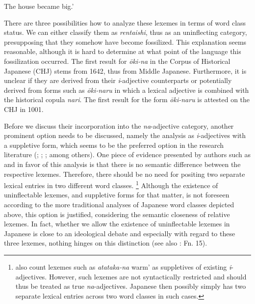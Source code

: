 \documentclass[output=paper]{langscibook}
\begin{document}
\begin{styleBeispielCinqueKapitel}
{\textasciigrave}The house became big.’
\end{styleBeispielCinqueKapitel}

There are three possibilities how to analyze these lexemes in terms of word class status. We can either classify them as \textit{rentaishi}, thus as an uninflecting category, presupposing that they somehow have become fossilized. This explanation seems reasonable, although it is hard to determine at what point of the language this fossilization occurred. The first result for \textit{ōki-na} in the Corpus of Historical Japanese (CHJ) stems from 1642, thus from Middle Japanese. Furthermore, it is unclear if they are derived from their \textit{i}{}-adjective counterparts or potentially derived from forms such as \textit{ōki-naru} in which a lexical adjective is combined with the historical copula \textit{nari}. The first result for the form \textit{ōki-naru} is attested on the CHJ in 1001.

Before we discuss their incorporation into the \textit{na}{}-adjective category, another prominent option needs to be discussed, namely the analysis as \textit{i}{}-adjectives with a suppletive form, which seems to be the preferred option in the research literature (\citealt{Suzuki1972}; \citealt{Rickmeyer1995}; \citealt{Muraki2012}; \citealt{LehmannNishina2015} among others). One piece of evidence presented by authors such as \citet{Suzuki1972} and \citet{LehmannNishina2015} in favor of this analysis is that there is no semantic difference between the respective lexemes. Therefore, there should be no need for positing two separate lexical entries in two different word classes.\textstyleFootnoteSymbol{} \footnote{\citet{LehmannNishina2015} also count lexemes such as \textit{atataka-na} {\textasciigrave}warm’ as suppletives of existing \textit{i}{}-adjectives. However, such lexemes are not syntactically restricted and should thus be treated as true \textit{na}{}-adjectives. Japanese then possibly simply has two separate lexical entries across two word classes in such cases.} Although the existence of uninflectable lexemes, and suppletive forms for that matter, is not foreseen according to the more traditional analyses of Japanese word classes depicted above, this option is justified, considering the semantic closeness of relative lexemes. In fact, whether we allow the existence of uninflectable lexemes in Japanese is close to an ideological debate and especially with regard to these three lexemes, nothing hinges on this distinction (see also \citealt{OshimaHayashi2021a}: Fn. 15).
\end{document}
